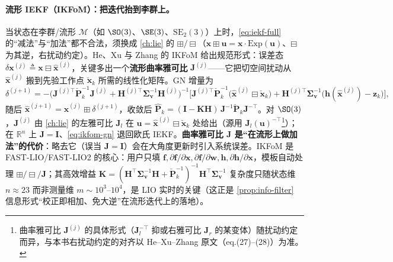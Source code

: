 \paragraph{流形 IEKF（IKFoM）：把迭代抬到李群上。}
当状态在李群/流形 $\mathcal{M}$（如 $\SO(3)$、$\SE(3)$、$\mathrm{SE}_2(3)$）上时，\cref{eq:iekf-full} 的“减法”与“加法”都不合法，须换成 \cref{ch:lie} 的 $\boxplus/\boxminus$（$\mathbf{x}\boxplus\mathbf{u}=\mathbf{x}\cdot\mathrm{Exp}(\mathbf{u})$、$\boxminus$ 为其逆，右扰动约定）。He、Xu 与 Zhang 的 IKFoM\cite{he2021ikfom} 给出规范形式：误差态 $\delta\mathbf{x}^{(j)}\triangleq\mathbf{x}\boxminus\hat{\mathbf{x}}^{(j)}$，关键多出一个\textbf{流形曲率雅可比} $\mathbf{J}^{(j)}$——它把切空间扰动从 $\hat{\mathbf{x}}^{(j)}$ 搬到先验工作点 $\check{\mathbf{x}}_k$ 所需的线性化矩阵。GN 增量为
\begin{equation}
  \delta^{(j+1)}=-\big(\mathbf{J}^{(j)\top}\check{\mathbf{P}}_k^{-1}\mathbf{J}^{(j)}+\mathbf{H}^{(j)\top}\boldsymbol{\Sigma}_{\mathbf{v}}^{-1}\mathbf{H}^{(j)}\big)^{-1}\Big[\mathbf{J}^{(j)\top}\check{\mathbf{P}}_k^{-1}\big(\hat{\mathbf{x}}^{(j)}\boxminus\check{\mathbf{x}}_k\big)+\mathbf{H}^{(j)\top}\boldsymbol{\Sigma}_{\mathbf{v}}^{-1}\big(\mathbf{h}(\hat{\mathbf{x}}^{(j)})-\mathbf{z}_k\big)\Big],
  \label{eq:ikfom-gn}
\end{equation}
随后 $\hat{\mathbf{x}}^{(j+1)}=\hat{\mathbf{x}}^{(j)}\boxplus\delta^{(j+1)}$，收敛后 $\hat{\mathbf{P}}_k=(\mathbf{I}-\mathbf{K}\mathbf{H})\,\mathbf{J}^{-1}\check{\mathbf{P}}_k\mathbf{J}^{-\top}$。对 $\SO(3)$，$\mathbf{J}^{(j)}$ 由 \cref{ch:lie} 的左雅可比 $\mathbf{J}_l$ 在 $\mathbf{u}=\hat{\mathbf{x}}^{(j)}\boxminus\check{\mathbf{x}}_k$ 处给出（源用 $\mathbf{J}_l(\mathbf{u})^{-\top}$\footnote{曲率雅可比 $\mathbf{J}^{(j)}$ 的具体形式（$\mathbf{J}_l^{-\top}$ 抑或右雅可比 $\mathbf{J}_r$ 的某变体）随扰动约定而异，与本书右扰动约定的对齐以 He--Xu--Zhang 原文（eq.(27)--(28)）为准。}）；在 $\mathbb{R}^n$ 上 $\mathbf{J}=\mathbf{I}$、\cref{eq:ikfom-gn} 退回欧氏 IEKF。\textbf{曲率雅可比 $\mathbf{J}$ 是“在流形上做加法”的代价}：略去它（误当 $\mathbf{J}=\mathbf{I}$）会在大角度更新时引入系统误差。IKFoM 是 FAST-LIO/FAST-LIO2 的核心\cite{xu2021fastlio,xu2022fastlio2}：用户只填 $\mathbf{f},\partial\mathbf{f}/\partial\mathbf{x},\partial\mathbf{f}/\partial\mathbf{w},\mathbf{h},\partial\mathbf{h}/\partial\mathbf{x}$，模板自动处理 $\boxplus/\boxminus/\mathbf{J}$；其高效增益 $\mathbf{K}=(\mathbf{H}^\top\boldsymbol{\Sigma}_{\mathbf{v}}^{-1}\mathbf{H}+\check{\mathbf{P}}_k^{-1})^{-1}\mathbf{H}^\top\boldsymbol{\Sigma}_{\mathbf{v}}^{-1}$ 复杂度只随状态维 $n\approx23$ 而非测量维 $m\sim10^3\text{--}10^4$，是 LIO 实时的关键（这正是 \cref{prop:info-filter} 信息形式“校正即相加、免大逆”在流形迭代上的落地）。

